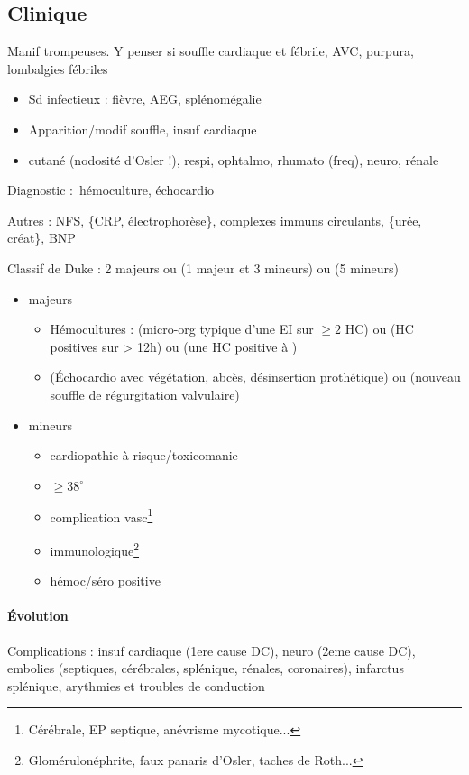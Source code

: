 \subsection{Clinique}
\danger Manif trompeuses. Y penser si souffle cardiaque et fébrile, AVC,
purpura, lombalgies fébriles

\begin{itemize}
  \item Sd infectieux : fièvre, AEG, splénomégalie
  \item Apparition/modif souffle, insuf cardiaque
  \item cutané (nodosité d'Osler !), respi, ophtalmo, rhumato (freq), neuro,
    rénale
\end{itemize}

Diagnostic : hémoculture, échocardio

Autres : NFS, \{CRP, électrophorèse\}, complexes immuns circulants, \{urée,
créat\}, BNP

Classif de Duke : 2 majeurs ou (1 majeur et 3 mineurs) ou (5 mineurs)
\begin{itemize}
  \item majeurs
    \begin{itemize}
      \item Hémocultures : (micro-org typique d'une EI sur $\ge 2$ HC) ou (HC
        positives sur > 12h) ou (une HC positive à )
      \item (Échocardio avec végétation, abcès, désinsertion prothétique) ou (nouveau souffle de régurgitation valvulaire)
    \end{itemize}
  \item mineurs
    \begin{itemize}
      \item cardiopathie à risque/toxicomanie
      \item $\ge 38^{\circ}$
      \item complication vasc\footnote{Cérébrale, EP septique, anévrisme mycotique...}
      \item immunologique\footnote{Glomérulonéphrite, faux panaris d'Osler,
          taches de Roth...}
      \item hémoc/séro positive
    \end{itemize}
\end{itemize}

\paragraph{Évolution}
Complications : insuf cardiaque (1ere cause DC), neuro (2eme cause DC), embolies (septiques,
cérébrales, splénique, rénales, coronaires), infarctus splénique, arythmies et
troubles de conduction

